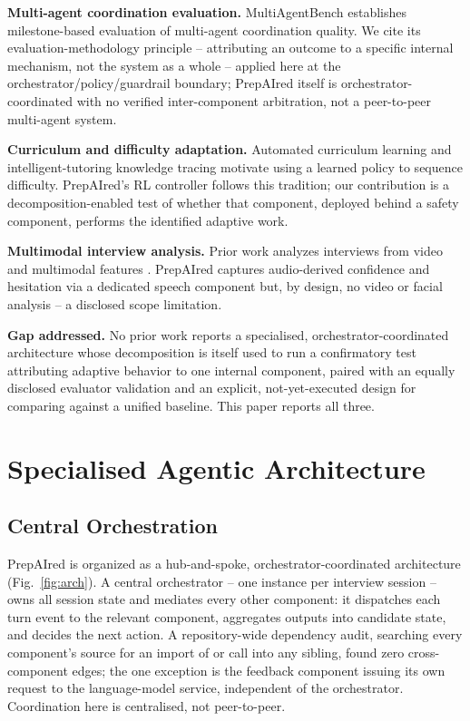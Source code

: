 \documentclass[conference]{IEEEtran}
\begin{document}
\textbf{Multi-agent coordination evaluation.} MultiAgentBench \cite{zhu2025} establishes milestone-based evaluation of multi-agent coordination quality. We cite its evaluation-methodology principle -- attributing an outcome to a specific internal mechanism, not the system as a whole -- applied here at the orchestrator/policy/guardrail boundary; PrepAIred itself is orchestrator-coordinated with no verified inter-component arbitration, not a peer-to-peer multi-agent system.

\textbf{Curriculum and difficulty adaptation.} Automated curriculum learning \cite{graves2017,portelas2020} and intelligent-tutoring knowledge tracing \cite{anderson1995,corbett1994} motivate using a learned policy to sequence difficulty. PrepAIred's RL controller follows this tradition; our contribution is a decomposition-enabled test of whether that component, deployed behind a safety component, performs the identified adaptive work.

\textbf{Multimodal interview analysis.} Prior work analyzes interviews from video and multimodal features \cite{naim2015,chen2017}. PrepAIred captures audio-derived confidence and hesitation via a dedicated speech component but, by design, no video or facial analysis -- a disclosed scope limitation.

\textbf{Gap addressed.} No prior work reports a specialised, orchestrator-coordinated architecture whose decomposition is itself used to run a confirmatory test attributing adaptive behavior to one internal component, paired with an equally disclosed evaluator validation and an explicit, not-yet-executed design for comparing against a unified baseline. This paper reports all three.

\section{Specialised Agentic Architecture}

\subsection{Central Orchestration}

PrepAIred is organized as a hub-and-spoke, orchestrator-coordinated architecture (Fig.~\ref{fig:arch}). A central orchestrator -- one instance per interview session -- owns all session state and mediates every other component: it dispatches each turn event to the relevant component, aggregates outputs into candidate state, and decides the next action. A repository-wide dependency audit, searching every component's source for an import of or call into any sibling, found zero cross-component edges; the one exception is the feedback component issuing its own request to the language-model service, independent of the orchestrator. Coordination here is centralised, not peer-to-peer.
\end{document}
